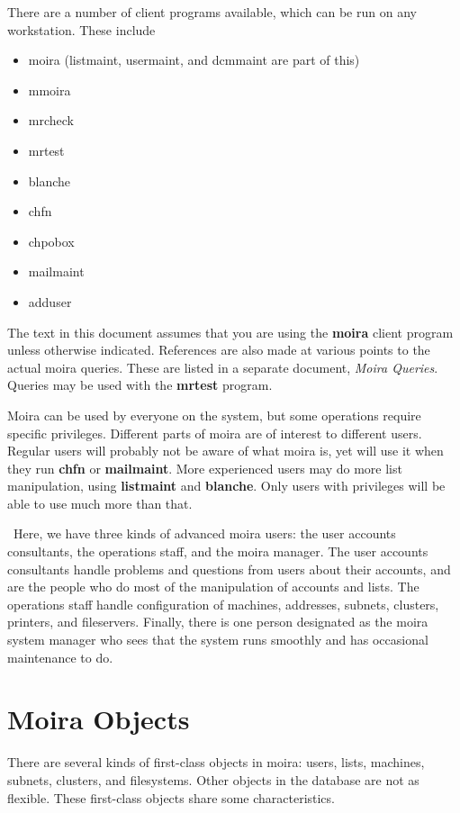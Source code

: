 There are a number of client programs available, which can be run on
any workstation.  These include
\begin{itemize}
\item moira (listmaint, usermaint, and dcmmaint are part of this)
\item mmoira
\item mrcheck
\item mrtest
\item blanche
\item chfn
\item chpobox
\item mailmaint
\item adduser
\end{itemize}
The text in this document assumes that you are using the {\bf moira}
client program unless otherwise indicated.  References are also made
at various points to the actual moira queries.  These are listed in a
separate document, {\em Moira Queries}.  Queries may be used with the
{\bf mrtest} program.

Moira can be used by everyone on the system, but some operations
require specific privileges.  Different parts of moira
are of interest to different users.  Regular users will probably not
be aware of what moira is, yet will use it when they run {\bf chfn} or
{\bf mailmaint}.  More experienced users may do more list manipulation,
using {\bf listmaint} and {\bf blanche}.  Only users with privileges will
be able to use much more than that.

\athena\ Here, we have three kinds of advanced moira users: the user
accounts consultants, the operations staff, and the moira manager.
The user accounts consultants handle problems and questions from users
about their accounts, and are the people who do most of the
manipulation of accounts and lists.  The operations staff handle
configuration of machines, addresses, subnets, clusters, printers, and
fileservers.  Finally, there is one person designated as the moira
system manager who sees that the system runs smoothly and has
occasional maintenance to do.

\section{Moira Objects}

There are several kinds of first-class objects in moira: users, lists,
machines, subnets, clusters, and filesystems.  Other objects in the
database are not as flexible.  These first-class objects share some
characteristics.

